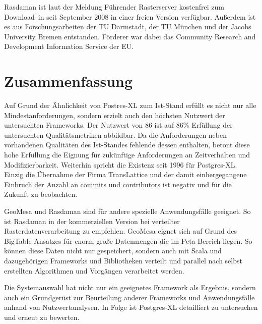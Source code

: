 Rasdaman ist laut der Meldung \glqq Führender Rasterserver kostenfrei zum Download\grqq\ in \cite{website:rasdaman-newsarchive} seit September 2008 in einer freien Version verfügbar.
Außerdem ist es aus Forschungsarbeiten der TU Darmstadt, der TU München und der Jacobs University Bremen entstanden.
Förderer war dabei das Community Research and Development Information Service der EU. \cite{website:rasdaman-cordis}

\section{Zusammenfassung}
Auf Grund der Ähnlichkeit von Postres-XL zum Ist-Stand erfüllt es nicht nur alle Mindestanforderungen, sondern erzielt auch den höchsten Nutzwert der untersuchten Frameworks.
Der Nutzwert von 86 ist auf 86\% Erfüllung der untersuchten Qualitätsmetriken abbildbar.
Da die Anforderungen neben vorhandenen Qualitäten des Ist-Standes fehlende dessen enthalten, betont diese hohe Erfüllung die Eignung für zukünftige Anforderungen an Zeitverhalten und Modifizierbarkeit.
Weiterhin spricht die Existenz seit 1996 für Postgres-XL.
Einzig die Übernahme der Firma TransLattice und der damit einhergegangene Einbruch der Anzahl an commits und contributors ist negativ und für die Zukunft zu beobachten.

GeoMesa und Rasdaman sind für andere spezielle Anwendungsfälle geeignet.
So ist Rasdaman in der kommerziellen Version bei verteilter Rasterdatenverarbeitung zu empfehlen.
GeoMesa eignet sich auf Grund des BigTable Ansatzes für enorm große Datenmengen die im Peta Bereich liegen.
So können diese Daten nicht nur gespeichert, sondern auch mit Scala und dazugehörigen Frameworks und Bibliotheken verteilt und parallel nach selbst erstellten Algorithmen und Vorgängen verarbeitet werden.

Die Systemauswahl hat nicht nur ein geeignetes Framework als Ergebnis, sondern auch ein Grundgerüst zur Beurteilung anderer Frameworks und Anwendungsfälle anhand von Nutzwertanalysen.
In Folge ist Postgres-XL detailliert zu untersuchen und erneut zu bewerten.